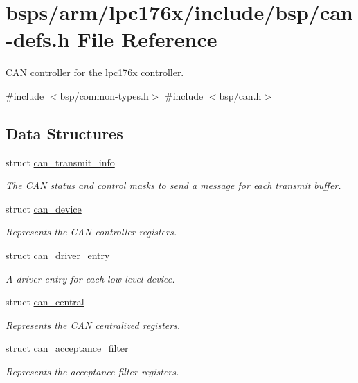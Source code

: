 \hypertarget{can-defs_8h}{}\section{bsps/arm/lpc176x/include/bsp/can-\/defs.h File Reference}
\label{can-defs_8h}


C\+AN controller for the lpc176x controller.  


{\ttfamily \#include $<$bsp/common-\/types.\+h$>$}\newline
{\ttfamily \#include $<$bsp/can.\+h$>$}\newline
\subsection*{Data Structures}
\begin{DoxyCompactItemize}
\item 
struct \mbox{\hyperlink{structcan__transmit__info}{can\+\_\+transmit\+\_\+info}}
\begin{DoxyCompactList}\small\item\em The C\+AN status and control masks to send a message for each transmit buffer. \end{DoxyCompactList}\item 
struct \mbox{\hyperlink{structcan__device}{can\+\_\+device}}
\begin{DoxyCompactList}\small\item\em Represents the C\+AN controller registers. \end{DoxyCompactList}\item 
struct \mbox{\hyperlink{structcan__driver__entry}{can\+\_\+driver\+\_\+entry}}
\begin{DoxyCompactList}\small\item\em A driver entry for each low level device. \end{DoxyCompactList}\item 
struct \mbox{\hyperlink{structcan__central}{can\+\_\+central}}
\begin{DoxyCompactList}\small\item\em Represents the C\+AN centralized registers. \end{DoxyCompactList}\item 
struct \mbox{\hyperlink{structcan__acceptance__filter}{can\+\_\+acceptance\+\_\+filter}}
\begin{DoxyCompactList}\small\item\em Represents the acceptance filter registers. \end{DoxyCompactList}\end{DoxyCompactItemize}
